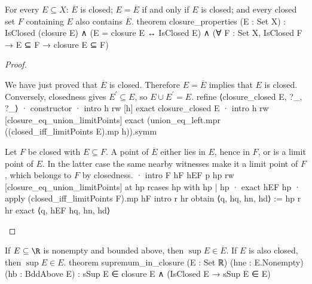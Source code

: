 \begin{proposition} \label{an1:thm:properties-of-closure}
  \begin{lean}{For every $E\subseteq X$: $\overline E$ is closed; $E=\overline E$ if and only if $E$ is closed; and every closed set $F$ containing $E$ also contains $\overline E$.}
    theorem closure_properties (E : Set X) :
        IsClosed (closure E) ∧ (E = closure E ↔ IsClosed E) ∧
        (∀ F : Set X, IsClosed F → E ⊆ F → closure E ⊆ F)
  \end{lean}
\end{proposition}

\begin{proof}
  \begin{lean}{We have just proved that $\overline E$ is closed. Therefore $E=\overline E$ implies that $E$ is closed. Conversely, closedness gives $E^{\prime}\subseteq E$, so $E\cup E^{\prime}=E$.}
    refine ⟨closure_closed E, ?_, ?_⟩
    · constructor
      · intro h
        rw [h]
        exact closure_closed E
      · intro h
        rw [closure_eq_union_limitPoints]
        exact (union_eq_left.mpr ((closed_iff_limitPoints E).mp h)).symm
  \end{lean}

  \begin{lean}{Let $F$ be closed with $E\subseteq F$. A point of $\overline E$ either lies in $E$, hence in $F$, or is a limit point of $E$. In the latter case the same nearby witnesses make it a limit point of $F$, which belongs to $F$ by closedness.}
    · intro F hF hEF p hp
      rw [closure_eq_union_limitPoints] at hp
      rcases hp with hp | hp
      · exact hEF hp
      · apply (closed_iff_limitPoints F).mp hF
        intro r hr
        obtain ⟨q, hq, hn, hd⟩ := hp r hr
        exact ⟨q, hEF hq, hn, hd⟩
  \end{lean}

\end{proof}

\begin{proposition} \label{an1:thm:supremum-in-closure}
  \begin{lean}{If $E\subseteq\R$ is nonempty and bounded above, then $\sup E\in\overline E$. If $E$ is also closed, then $\sup E\in E$.}
    theorem supremum_in_closure (E : Set ℝ) (hne : E.Nonempty) (hb : BddAbove E) :
        sSup E ∈ closure E ∧ (IsClosed E → sSup E ∈ E)
  \end{lean}
\end{proposition}


